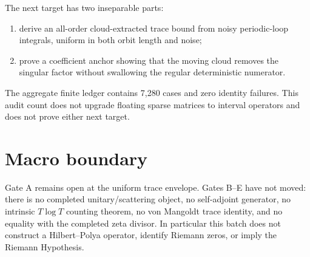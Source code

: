 \documentclass[11pt]{article}
\theoremstyle{remark}
\begin{document}
The next target has two inseparable parts:
\begin{enumerate}[leftmargin=2em]
\item derive an all-order cloud-extracted trace bound from noisy periodic-loop
integrals, uniform in both orbit length and noise;
\item prove a coefficient anchor showing that the moving cloud removes the
singular factor without swallowing the regular deterministic numerator.
\end{enumerate}

The aggregate finite ledger contains 7,280 cases and zero identity failures.
This audit count does not upgrade floating sparse matrices to interval
operators and does not prove either next target.

\section{Macro boundary}

Gate A remains open at the uniform trace envelope.  Gates B--E have not moved:
there is no completed unitary/scattering object, no self-adjoint generator,
no intrinsic $T\log T$ counting theorem, no von Mangoldt trace identity, and
no equality with the completed zeta divisor.  In particular this batch does
not construct a Hilbert--Polya operator, identify Riemann zeros, or imply the
Riemann Hypothesis.



\end{document}
